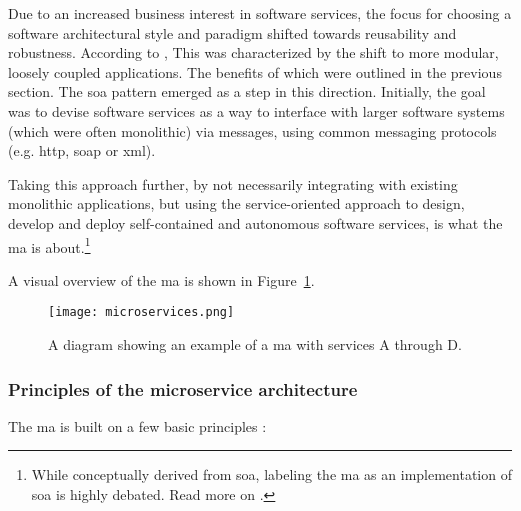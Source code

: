 Due to an increased business interest in software services, the focus for
choosing a software architectural style and paradigm shifted towards reusability
and robustness. According to \textcite{Dragoni_etal_2018}, This was
characterized by the shift to more modular, loosely coupled applications. The
benefits of which were outlined in the previous section. The \gls{soa} pattern
emerged as a step in this direction. Initially, the goal was to devise software
services as a way to interface with larger software systems (which were often
monolithic) via messages, using common messaging protocols (e.g. \gls{http},
\gls{soap} or \gls{xml}).

Taking this approach further, by not necessarily integrating with existing
\gls{monolithic} applications, but using the service-oriented approach to design,
develop and deploy self-contained and autonomous software services, is what the
\gls{ma} is about.\footnote{While conceptually derived from \gls{soa}, labeling
the \gls{ma} as an implementation of \gls{soa} is highly debated. Read more on
.}


A visual overview of the \gls{ma} is shown in Figure~\ref{fig:microservices}.


\begin{figure}
    \centering
    \texttt{[image: microservices.png]}
    \caption[Microservices]{A diagram showing an example of a \gls{ma} with
    services A through D.}
    \label{fig:microservices}
\end{figure}


\subsubsection{Principles of the microservice architecture}
\label{principles-of-the-mfa}

The \gls{ma} is built on a few basic principles \autocite{Dragoni_etal_2018}
\autocite{Dragoni_etal_2017} \autocite{Fowler_Microservices_2014}
\autocite{Gysels_2020} \autocite{Newman_2015}:

